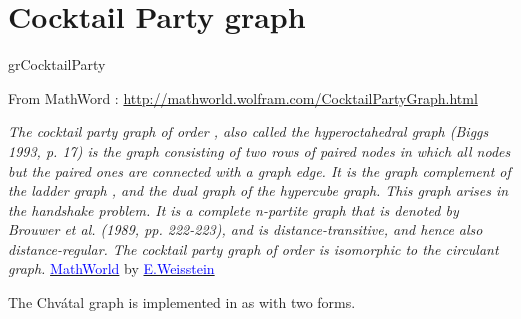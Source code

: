 \newpage\section{Cocktail Party graph}\label{cocktail}
\begin{NewMacroBox}{grCocktailParty}{}

\medskip
From MathWord : \url{http://mathworld.wolfram.com/CocktailPartyGraph.html}  

\emph{The cocktail party graph of order , also called the hyperoctahedral graph (Biggs 1993, p. 17) is the graph consisting of two rows of paired nodes in which all nodes but the paired ones are connected with a graph edge. It is the graph complement of the ladder graph , and the dual graph of the hypercube graph.\hfill\break
This graph arises in the handshake problem. It is a complete n-partite graph that is denoted  by Brouwer et al. (1989, pp. 222-223), and is distance-transitive, and hence also distance-regular.\hfill\break
The cocktail party graph of order  is isomorphic to the circulant graph.}
\href{http://mathworld.wolfram.com/topics/GraphTheory.html}%
           {\textcolor{blue}{MathWorld}} by \href{http://en.wikipedia.org/wiki/Eric_W._Weisstein}%
           {\textcolor{blue}{E.Weisstein}}

\medskip
The Chvátal graph is implemented in  as  with two forms.
\end{NewMacroBox}

\subsection{}
\SetVertexMath
{} 
\begin{center}
   \begin{tkzexample}[vbox]
\end{tkzexample} 
\end{center}

\vfill\newpage
\subsection{}

\vspace*{2cm}
\begin{center}
   \begin{tkzexample}[vbox]
\end{tkzexample} 
\end{center}
\endinput
